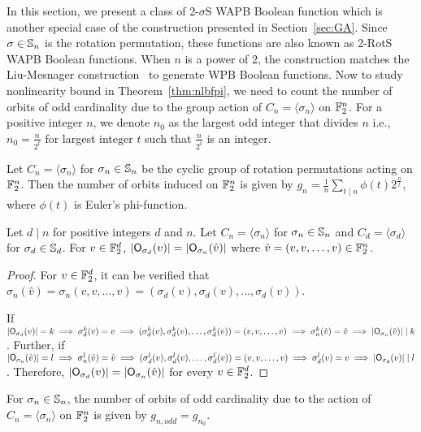 \documentclass{llncs}
\begin{document}
In this section, we present a class of 2-$\sigma$S WAPB Boolean function which is another special case of the construction presented in Section~\ref{sec:GA}. Since $\sigma \in \mathbb{S}_n$ is the rotation permutation, these functions are also known as 2-RotS WAPB Boolean functions. When $n$ is a power of $2$, the construction matches the Liu-Mesnager construction~\cite{DCC:LiuMes19} to generate WPB Boolean functions. Now to study nonlinearity bound in Theorem~\ref{thm:nlbfpi}, we need to count the number of orbits of odd cardinality due to the group action of $C_n = \langle \sigma_n \rangle$ on $\mathbb{F}_2^n$. For a positive integer $n$, we denote $n_0$ as the largest odd integer that divides $n$ i.e., $n_0 = \frac{n}{2^t}$ for largest integer $t$ such that $\frac{n}{2^t}$ is an integer.
\begin{proposition}\label{prop:no_orb}
Let $C_n = \langle \sigma_n \rangle$ for $\sigma_n \in \mathbb{S}_n$ be the cyclic group of rotation permutations acting on $\mathbb{F}_2^n$. Then the number of orbits induced on $\mathbb{F}_2^n$ is given by $g_n= \frac{1}{n} \sum\limits_{t \mid n} \phi(t)2^{\frac{n}{t}}$, where $\phi(t)$ is Euler's phi-function. 
\end{proposition}

\begin{lemma}\label{lem:orb_d}
Let $d \mid n$ for positive integers $d$ and $n$. Let $C_n= \langle \sigma_n \rangle$ for $\sigma_n \in \mathbb{S}_n$ and $C_d = \langle \sigma_d \rangle$ for $\sigma_d \in \mathbb{S}_d$. For $v \in \mathbb{F}_2^d$, $|\mathsf{O}_{\sigma_d}(v)| = |\mathsf{O}_{\sigma_n}(\hat{v})|$ where $\hat{v} = (v,v,\ldots,v) \in \mathbb{F}_2^n$.  
\end{lemma}
\begin{proof}
For $v \in \mathbb{F}_2^d$, it can be verified that $\sigma_n(\hat{v}) = \sigma_n(v,v,\ldots,v) = (\sigma_d(v),\sigma_d(v),\ldots,\sigma_d(v))$.

If $|\mathsf{O}_{\sigma_d}(v)| = k \implies \sigma_d^k(v) = v \implies (\sigma_d^k(v),\sigma_d^k(v),\ldots,\sigma_d^k(v)) = (v,v,\ldots,v) \implies \sigma_n^k(\hat{v}) = \hat{v} \implies |\mathsf{O}_{\sigma_n}(\hat{v})| \mid k$.
Further, if $|\mathsf{O}_{\sigma_n}(\hat{v})| = l \implies \sigma_n^l(\hat{v}) = \hat{v} \implies (\sigma_d^l(v),\sigma_d^l(v),\ldots,\sigma_d^l(v)) = (v,v,\ldots,v)
\implies \sigma_d^l(v) = v \implies |\mathsf{O}_{\sigma_d}(v)| \mid l$.
Therefore, $|\mathsf{O}_{\sigma_d}(v)| = |\mathsf{O}_{\sigma_n}(\hat{v})|$ for every $v \in \mathbb{F}_2^d$.
\end{proof}

\begin{theorem}\label{thm:oddorbs}
For $\sigma_n \in \mathbb{S}_n$, the number of orbits of odd cardinality due to the action of $C_n = \langle\sigma_n\rangle$ on $\mathbb{F}_2^n$ is given by
$g_{n,odd} = g_{n_0}$.
\end{theorem}
\end{document}
